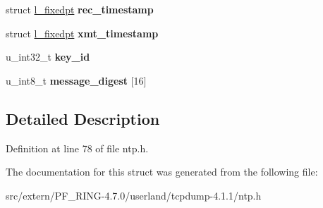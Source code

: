 \begin{DoxyCompactItemize}
\item 
\hypertarget{structntpdata_a4aae982be254ddebd227e3d32dca609f}{
struct \hyperlink{structl__fixedpt}{l\_\-fixedpt} {\bfseries rec\_\-timestamp}}
\label{structntpdata_a4aae982be254ddebd227e3d32dca609f}

\item 
\hypertarget{structntpdata_aeaffe45cf5f151a6d092fa483b889372}{
struct \hyperlink{structl__fixedpt}{l\_\-fixedpt} {\bfseries xmt\_\-timestamp}}
\label{structntpdata_aeaffe45cf5f151a6d092fa483b889372}

\item 
\hypertarget{structntpdata_a8c65e971b4c8221dbc318ebf51cbac01}{
u\_\-int32\_\-t {\bfseries key\_\-id}}
\label{structntpdata_a8c65e971b4c8221dbc318ebf51cbac01}

\item 
\hypertarget{structntpdata_ac2d1f512125b4e688913a2095fc0910d}{
u\_\-int8\_\-t {\bfseries message\_\-digest} \mbox{[}16\mbox{]}}
\label{structntpdata_ac2d1f512125b4e688913a2095fc0910d}

\end{DoxyCompactItemize}


\subsection{Detailed Description}


Definition at line 78 of file ntp.h.



The documentation for this struct was generated from the following file:\begin{DoxyCompactItemize}
\item 
src/extern/PF\_\-RING-\/4.7.0/userland/tcpdump-\/4.1.1/ntp.h\end{DoxyCompactItemize}
